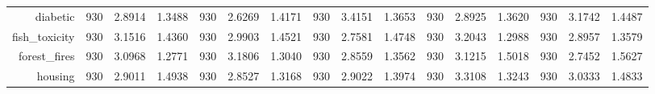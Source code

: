 \begin{table}[htbp]
{\begin{tabular}{rccccccccccccccc}
                  diabetic                            & 930                                 & 2.8914                                                                    & 1.3488          & 930                                & \cellcolor[rgb]{ .776,  .937,  .808}\textcolor[rgb]{ 0,  .38,  0}{2.6269}          & 1.4171          & 930                                & 3.4151                                                                    & 1.3653          & 930                                & 2.8925                                                                    & 1.3620          & 930                                    & 3.1742                                                                    & 1.4487          \\
                  fish\_toxicity                      & 930                                 & 3.1516                                                                    & 1.4360          & 930                                & 2.9903                                                                             & 1.4521          & 930                                & \cellcolor[rgb]{ .776,  .937,  .808}\textcolor[rgb]{ 0,  .38,  0}{2.7581} & 1.4748          & 930                                & 3.2043                                                                    & 1.2988          & 930                                    & 2.8957                                                                    & 1.3579          \\
                  forest\_fires                       & 930                                 & 3.0968                                                                    & 1.2771          & 930                                & 3.1806                                                                             & 1.3040          & 930                                & 2.8559                                                                    & 1.3562          & 930                                & 3.1215                                                                    & 1.5018          & 930                                    & \cellcolor[rgb]{ .776,  .937,  .808}\textcolor[rgb]{ 0,  .38,  0}{2.7452} & 1.5627          \\
                  housing                             & 930                                 & 2.9011                                                                    & 1.4938          & 930                                & \cellcolor[rgb]{ .776,  .937,  .808}\textcolor[rgb]{ 0,  .38,  0}{2.8527}          & 1.3168          & 930                                & 2.9022                                                                    & 1.3974          & 930                                & 3.3108                                                                    & 1.3243          & 930                                    & 3.0333                                                                    & 1.4833          \\

\end{tabular}}
\end{table}
